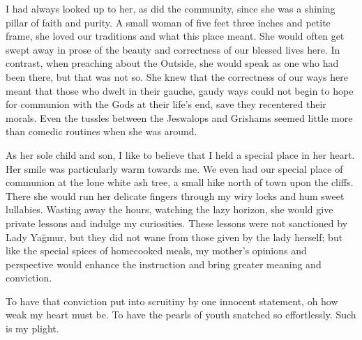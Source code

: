 \documentclass[11pt]{memoir}
\begin{document}
    I had always looked up to her, as did the community, since she was a shining pillar of faith and purity. A small woman of five feet three inches and petite frame, she loved our traditions and what this place meant. She would often get swept away in prose of the beauty and correctness of our blessed lives here. In contrast, when preaching about the Outside, she would speak as one who had been there, but that was not so. She knew that the correctness of our ways here meant that those who dwelt in their gauche, gaudy ways could not begin to hope for communion with the Gods at their life's end, save they recentered their morals. Even the tussles between the Jeswalops and Grishams seemed little more than comedic routines when she was around.

    As her sole child and son, I like to believe that I held a special place in her heart. Her smile was particularly warm towards me. We even had our special place of communion at the lone white ash tree, a small hike north of town upon the cliffs. There she would run her delicate fingers through my wiry locks and hum sweet lullabies. Wasting away the hours, watching the lazy horizon, she would give private lessons and indulge my curiosities. These lessons were not sanctioned by Lady Yağmur, but they did not wane from those given by the lady herself; but like the special spices of homecooked meals, my mother's opinions and perspective would enhance the instruction and bring greater meaning and conviction.

    To have that conviction put into scruitiny by one innocent statement, oh how weak my heart must be. To have the pearls of youth snatched so effortlessly. Such is my plight.

\mainmatter



\backmatter
\end{document}
